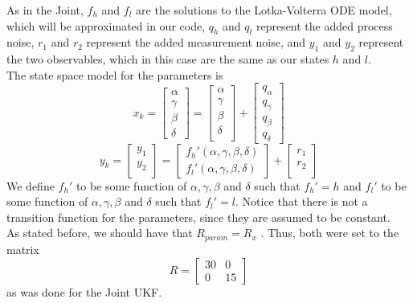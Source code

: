 As in the Joint, $f_h$ and $f_l$ are the solutions to the Lotka-Volterra ODE model, which will be approximated in our code, $q_h$ and $q_l$ represent the added process noise, $r_1$ and $r_2$ represent the added measurement noise, and $y_1$ and $y_2$ represent the two observables, which in this case are the same as our states $h$ and $l$.\\
The state space model for the parameters is
\begin{equation}
x_k = \begin{bmatrix}
\alpha\\
\gamma\\
\beta\\
\delta
\end{bmatrix} = \begin{bmatrix}
\alpha\\
\gamma\\
\beta\\
\delta\\
\end{bmatrix} + \begin{bmatrix}
q_{\alpha}\\
q_{\gamma}\\
q_{\beta}\\
q_{\delta}
\end{bmatrix}
\end{equation}
\begin{equation}
y_k = \begin{bmatrix}
y_1\\
y_2\\
\end{bmatrix} = 
\begin{bmatrix}
f_{h}'(\alpha, \gamma, \beta,\delta)\\
f_{l}'(\alpha, \gamma, \beta,\delta)
\end{bmatrix}+
\begin{bmatrix}
r_1\\
r_2\\
\end{bmatrix}
\end{equation}
We define $f_h'$ to be some function of $\alpha, \gamma, \beta$ and $\delta$ such that $f_h' = h$ and $f_l'$ to be  some function of $\alpha, \gamma, \beta$ and $\delta$ such that $f_l' = l$. Notice that there is not a transition function for the parameters, since they are assumed to be constant. \\

As stated before, we should have that $R_{param} = R_x$ \cite{GoveHollingerDual}. Thus, both were set to the matrix
\begin{equation}
R = \begin{bmatrix}
30 & 0\\0 & 15\end{bmatrix} 
\end{equation}
as was done for the Joint UKF.

